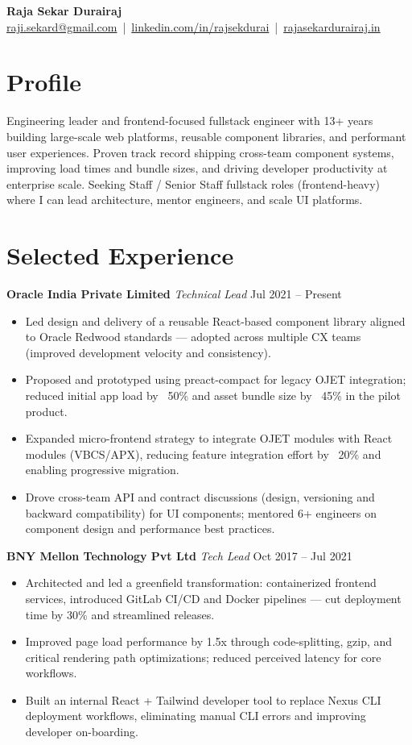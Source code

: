\documentclass[a4paper,10pt]{article}
\begin{document}
{\LARGE \bf Raja Sekar Durairaj} \\
\href{mailto:raji.sekard@gmail.com}{raji.sekard@gmail.com} $\,$|$\,$ \href{https://www.linkedin.com/in/rajsekdurai}{linkedin.com/in/rajsekdurai} $\,$|$\,$ \href{https://www.rajasekardurairaj.in/}{rajasekardurairaj.in}

\section{Profile}
Engineering leader and frontend-focused fullstack engineer with 13+ years building large-scale web platforms, reusable component libraries, and performant user experiences. Proven track record shipping cross-team component systems, improving load times and bundle sizes, and driving developer productivity at enterprise scale. Seeking Staff / Senior Staff fullstack roles (frontend-heavy) where I can lead architecture, mentor engineers, and scale UI platforms.

\section{Selected Experience}
\textbf{Oracle India Private Limited} \hfill \textit{Technical Lead} \hfill Jul 2021 -- Present 
\begin{itemize}
  \item Led design and delivery of a reusable React-based component library aligned to Oracle Redwood standards — adopted across multiple CX teams (improved development velocity and consistency).
  \item Proposed and prototyped using preact-compact for legacy OJET integration; reduced initial app load by ~50\% and asset bundle size by ~45\% in the pilot product.
  \item Expanded micro-frontend strategy to integrate OJET modules with React modules (VBCS/APX), reducing feature integration effort by ~20\% and enabling progressive migration.
  \item Drove cross-team API and contract discussions (design, versioning and backward compatibility) for UI components; mentored 6+ engineers on component design and performance best practices.
\end{itemize}

\textbf{BNY Mellon Technology Pvt Ltd} \hfill \textit{Tech Lead} \hfill Oct 2017 -- Jul 2021 
\begin{itemize}
  \item Architected and led a greenfield transformation: containerized frontend services, introduced GitLab CI/CD and Docker pipelines — cut deployment time by 30\% and streamlined releases.
  \item Improved page load performance by 1.5x through code-splitting, gzip, and critical rendering path optimizations; reduced perceived latency for core workflows.
  \item Built an internal React + Tailwind developer tool to replace Nexus CLI deployment workflows, eliminating manual CLI errors and improving developer on-boarding.
\end{itemize}
\end{document}
